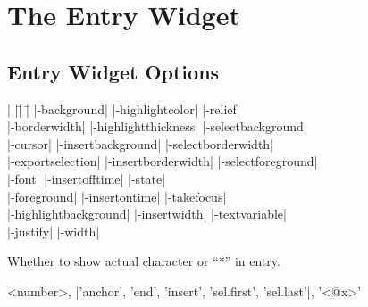 
\section{The Entry Widget}

\subsection*{Entry Widget Options}
\begin{tabbing}
|                    |\=|                     |\= \kill
|-background|       \> |-highlightcolor|     \> |-relief| \\
|-borderwidth|      \> |-highlightthickness| \> |-selectbackground| \\             
|-cursor|	    \> |-insertbackground|   \> |-selectborderwidth| \\   
|-exportselection|  \> |-insertborderwidth|  \> |-selectforeground| \\  
|-font|             \> |-insertofftime|      \> |-state| \\   
|-foreground|       \> |-insertontime|       \> |-takefocus| \\       
|-highlightbackground| \> |-insertwidth|     \> |-textvariable| \\              
 \> |-justify| \> |-width| \\
\end{tabbing}

\vskip5pt
\begin{enum}{1cm}

Whether to show actual character or ``*'' in entry.

\end{enum}
\begin{enum}{2.5cm}

<number>, |'anchor', 'end', 'insert', 'sel.first', 'sel.last'|, '<@x>'

\end{enum}

